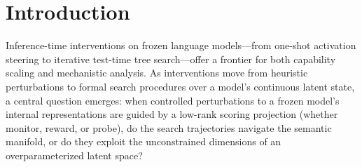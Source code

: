 \documentclass{article}
\begin{document}
\section{Introduction}\label{sec:introduction}

Inference-time interventions on frozen language models---from one-shot activation steering to iterative test-time tree search---offer a frontier for both capability scaling and mechanistic analysis. As interventions move from heuristic perturbations to formal search procedures over a model's continuous latent state, a central question emerges: when controlled perturbations to a frozen model's internal representations are guided by a low-rank scoring projection (whether monitor, reward, or probe), do the search trajectories navigate the semantic manifold, or do they exploit the unconstrained dimensions of an overparameterized latent space?
\end{document}

